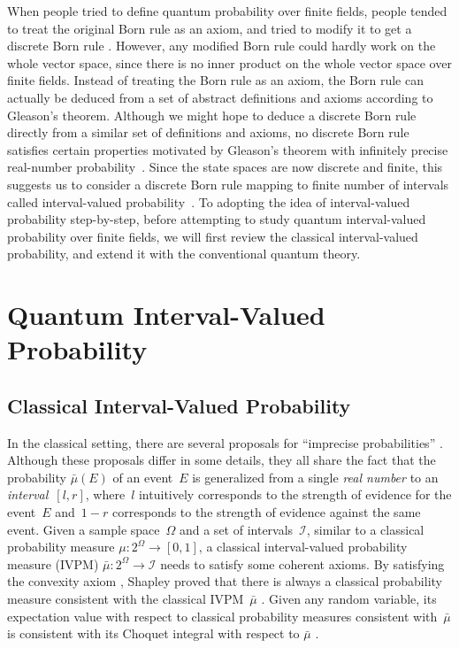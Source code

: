 \documentclass[twoside]{iuphd}
\begin{document}
When people tried to define quantum probability over finite fields,
people tended to treat the original Born rule as an axiom, and tried
to modify it to get a discrete Born rule \cite{Schumacher2012-SCHMQT,doi:10.1142/S0217984913500644,DQT2014,Ellerman2016a}.
However, any modified Born rule could hardly work on the whole vector
space, since there is no inner product on the whole vector space over
finite fields. Instead of treating the Born rule as an axiom, the
Born rule can actually be deduced from a set of abstract definitions
and axioms according to Gleason's theorem. Although we might hope
to deduce a discrete Born rule directly from a similar set of definitions
and axioms, no discrete Born rule satisfies certain properties motivated
by Gleason's theorem with infinitely precise real-number probability~\cite{Gardiner2014}.
Since the state spaces are now discrete and finite, this suggests
us to consider a discrete Born rule mapping to finite number of intervals
called interval-valued probability~\cite{JamisonLodwick2004,THOS2017}.
To adopting the idea of interval-valued probability step-by-step,
before attempting to study quantum interval-valued probability over
finite fields, we will first review the classical interval-valued
probability, and extend it with the conventional quantum theory.

\chapter{Quantum Interval-Valued Probability}

\section{Classical Interval-Valued Probability}

In the classical setting, there are several proposals for ``imprecise
probabilities'' \cite{Shafer1976,GilboaSchmeidler1994,Marinacci1999,JamisonLodwick2004,HuberRonchetti2009,Grabisch2016}.
Although these proposals differ in some details, they all share the
fact that the probability $\bar{\mu}(E)$ of an event~$E$ is generalized
from a single \emph{real number} to an \emph{interval}~$[l,r]$,
where~$l$ intuitively corresponds to the strength of evidence for
the event~$E$ and~$1-r$ corresponds to the strength of evidence
against the same event. Given a sample space~$\Omega$ and a set
of intervals~$\mathscr{I}$, similar to a classical probability measure
$\mu:2^{\Omega}\rightarrow\left[0,1\right]$, a classical interval-valued
probability measure (IVPM) $\bar{\mu}:2^{\Omega}\rightarrow\mathscr{I}$
needs to satisfy some coherent axioms. By satisfying the convexity
axiom \cite{Shapley1971,GilboaSchmeidler1994,Marinacci1999,Grabisch2016},
Shapley proved that there is always a classical probability measure
consistent with the classical IVPM~$\bar{\mu}$ \cite{Shapley1971,GilboaSchmeidler1994,Grabisch2016}.
Given any random variable, its expectation value with respect to classical
probability measures consistent with~$\bar{\mu}$ is consistent with
its Choquet integral \cite{Choquet1954,GilboaSchmeidler1994,Grabisch2016}
with respect to $\bar{\mu}$ \cite{Rosenmuller1971,GilboaSchmeidler1994,Grabisch2016}.
\end{document}

